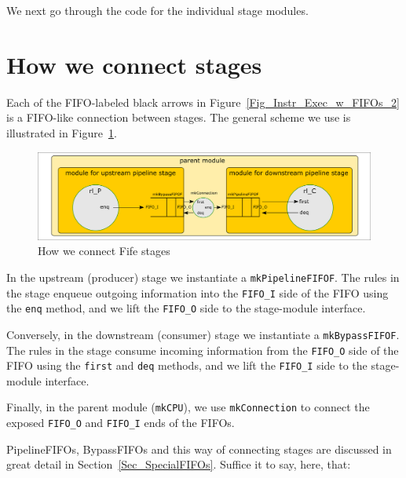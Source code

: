We next go through the code for the individual stage modules.


\section{How we connect stages}

\label{Sec_Fife_connections}

Each of the FIFO-labeled black arrows in
Figure~\ref{Fig_Instr_Exec_w_FIFOs_2} is a FIFO-like connection
between stages.  The general scheme we use is illustrated in
Figure~\ref{Fig_Fife_connections}.
\begin{figure}[htbp]
  \centerline{\includegraphics[width=6in,angle=0]{Figures/Fig_Composed_FIFO_modularity}}
  \caption{\label{Fig_Fife_connections} How we connect Fife stages}
\end{figure}

In the upstream (producer) stage we instantiate a
\verb|mkPipelineFIFOF|.  The rules in the stage enqueue outgoing
information into the \verb|FIFO_I| side of the FIFO using the
\verb|enq| method, and we lift the \verb|FIFO_O| side to the
stage-module interface.

Conversely, in the downstream (consumer) stage we instantiate a
\verb|mkBypassFIFOF|.  The rules in the stage consume incoming
information from the \verb|FIFO_O| side of the FIFO using the
\verb|first| and \verb|deq| methods, and we lift the \verb|FIFO_I|
side to the stage-module interface.

Finally, in the parent module (\verb|mkCPU|), we use
\verb|mkConnection| to connect the exposed \verb|FIFO_O| and
\verb|FIFO_I| ends of the FIFOs.

PipelineFIFOs, BypassFIFOs and this way of connecting stages are
discussed in great detail in Section~\ref{Sec_SpecialFIFOs}.  Suffice
it to say, here, that:


